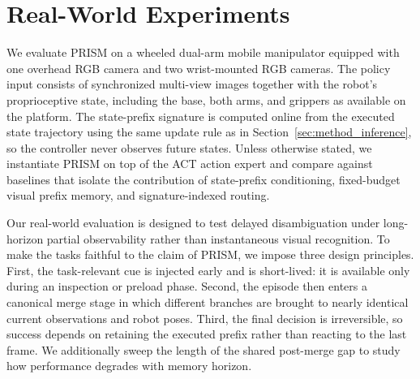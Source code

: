 
\section{Real-World Experiments}
\label{sec:real_world}

We evaluate PRISM on a wheeled dual-arm mobile manipulator equipped with one overhead RGB camera and two wrist-mounted RGB cameras. The policy input consists of synchronized multi-view images together with the robot's proprioceptive state, including the base, both arms, and grippers as available on the platform. The state-prefix signature is computed online from the executed state trajectory using the same update rule as in Section~\ref{sec:method_inference}, so the controller never observes future states. Unless otherwise stated, we instantiate PRISM on top of the ACT action expert and compare against baselines that isolate the contribution of state-prefix conditioning, fixed-budget visual prefix memory, and signature-indexed routing.

Our real-world evaluation is designed to test delayed disambiguation under long-horizon partial observability rather than instantaneous visual recognition. To make the tasks faithful to the claim of PRISM, we impose three design principles. First, the task-relevant cue is injected early and is short-lived: it is available only during an inspection or preload phase. Second, the episode then enters a canonical merge stage in which different branches are brought to nearly identical current observations and robot poses. Third, the final decision is irreversible, so success depends on retaining the executed prefix rather than reacting to the last frame. We additionally sweep the length of the shared post-merge gap to study how performance degrades with memory horizon.

